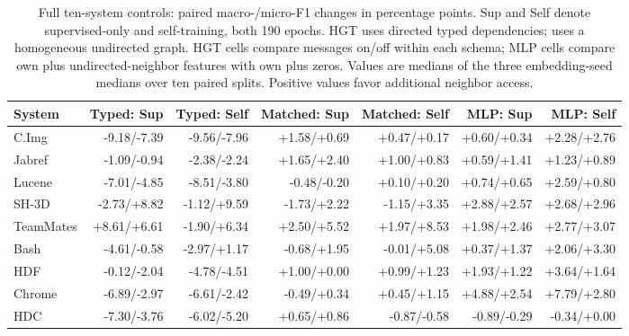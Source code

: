 \begin{table}[t]
\centering\small
\caption{Full ten-system controls: paired macro-/micro-F1 changes in percentage points. Sup and Self denote supervised-only and self-training, both 190 epochs. HGT uses directed typed dependencies; \uhgt uses a homogeneous undirected graph. HGT cells compare messages on/off within each schema; MLP cells compare own plus undirected-neighbor features with own plus zeros. Values are medians of the three embedding-seed medians over ten paired splits. Positive values favor additional neighbor access.\label{tab:full_controls}}
\begin{adjustbox}{max width=\textwidth}
\begin{tabular}{lrrrrrr}
\toprule
System & Typed: Sup & Typed: Self & Matched: Sup & Matched: Self & MLP: Sup & MLP: Self \\
\midrule
C.Img & -9.18/-7.39 & -9.56/-7.96 & +1.58/+0.69 & +0.47/+0.17 & +0.60/+0.34 & +2.28/+2.76 \\
Jabref & -1.09/-0.94 & -2.38/-2.24 & +1.65/+2.40 & +1.00/+0.83 & +0.59/+1.41 & +1.23/+0.89 \\
Lucene & -7.01/-4.85 & -8.51/-3.80 & -0.48/-0.20 & +0.10/+0.20 & +0.74/+0.65 & +2.59/+0.80 \\
SH-3D & -2.73/+8.82 & -1.12/+9.59 & -1.73/+2.22 & -1.15/+3.35 & +2.88/+2.57 & +2.68/+2.96 \\
TeamMates & +8.61/+6.61 & -1.90/+6.34 & +2.50/+5.52 & +1.97/+8.53 & +1.98/+2.46 & +2.77/+3.07 \\
Bash & -4.61/-0.58 & -2.97/+1.17 & -0.68/+1.95 & -0.01/+5.08 & +0.37/+1.37 & +2.06/+3.30 \\
HDF & -0.12/-2.04 & -4.78/-4.51 & +1.00/+0.00 & +0.99/+1.23 & +1.93/+1.22 & +3.64/+1.64 \\
Chrome & -6.89/-2.97 & -6.61/-2.42 & -0.49/+0.34 & +0.45/+1.15 & +4.88/+2.54 & +7.79/+2.80 \\
HDC & -7.30/-3.76 & -6.02/-5.20 & +0.65/+0.86 & -0.87/-0.58 & -0.89/-0.29 & -0.34/+0.00 \\
\bottomrule
\end{tabular}
\end{adjustbox}
\end{table}

